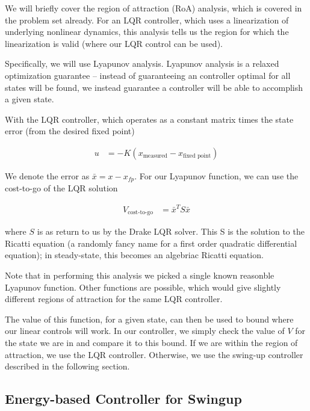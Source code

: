 \documentclass[conference]{IEEEtran}
\begin{document}
We will briefly cover the region of attraction (RoA) analysis, which is covered
in the problem set already. For an LQR controller, which uses a linearization of
underlying nonlinear dynamics, this analysis tells us the region for which the
linearization is valid (where our LQR control can be used). 

Specifically, we will use Lyapunov analysis. Lyapunov analysis is a relaxed
optimization guarantee -- instead of guaranteeing an controller optimal for all
states will be found, we instead guarantee a controller will be able to
accomplish a given state. 

With the LQR controller, which operates as a constant matrix times the 
state error (from the desired fixed point)

\begin{align}
    u &= - K(x_{\text{measured}} - x_{\text{fixed point}})
\end{align}

We denote the error as $\bar x = x - x_{fp}$. For our Lyapunov function, we can use the cost-to-go of the LQR solution 

\begin{align}
    V_{\text{cost-to-go}} &= \bar x^T S \bar x
\end{align}

where $S$ is as return to us by the Drake LQR solver. This S is the solution to
the Ricatti equation (a randomly fancy name for a first order quadratic
differential equation); in steady-state, this becomes an algebriac Ricatti
equation.

Note that in performing this analysis we picked a single known
reasonble Lyapunov function. Other functions are possible, which would give
slightly different regions of attraction for the same LQR controller.


The value of this function, for a given state, can then be used to bound where
our linear controls will work. In our controller, we simply check the value of
$V$ for the state we are in and compare it to this bound. If we are within the
region of attraction, we use the LQR controller. Otherwise, we use the 
swing-up controller described in the following section.

\subsection{Energy-based Controller for Swingup}
\end{document}
